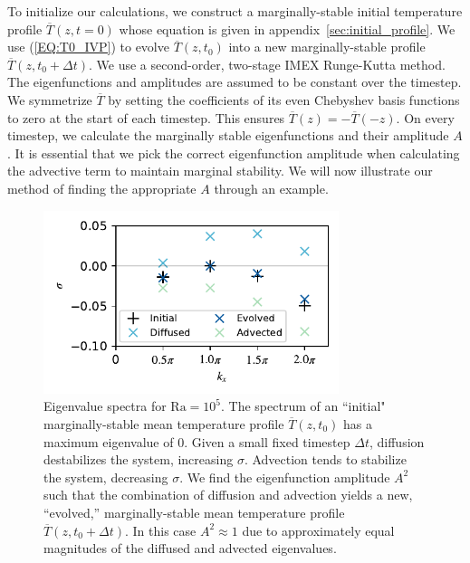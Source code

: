 \documentclass[reprint,amsmath,amssymb,aps,nofootinbib]{revtex4-1}
\newcommand\Ra{\mathrm{Ra}}
\newcommand{\eq}[1]{(\ref{#1})}
\begin{document}


To initialize our calculations, we construct a marginally-stable initial temperature profile $\overline{T}(z, t=0)$ whose equation is given in appendix~\ref{sec:initial_profile}. 
We use \eq{EQ:T0_IVP} to evolve $\overline{T}(z, t_0)$ into a new marginally-stable profile $\overline{T}(z, t_0 + \Delta t)$.
We use a second-order, two-stage IMEX Runge-Kutta method.
The eigenfunctions and amplitudes are assumed to be constant over the timestep.
We symmetrize $\overline{T}$ by setting the coefficients of its even Chebyshev basis functions to zero at the start of each timestep.
This ensures $\overline{T}(z) = -\overline{T}(-z)$.
On every timestep, we calculate the marginally stable eigenfunctions and their amplitude $A$.
It is essential that we pick the correct eigenfunction amplitude when calculating the advective term to maintain marginal stability.
We will now illustrate our method of finding the appropriate $A$ through an example.

\begin{figure}
    \includegraphics[width=3.4in]{EV_spectrum_ol.pdf}
    \caption{Eigenvalue spectra for $\Ra = 10^5$. The spectrum of an ``initial" marginally-stable mean temperature profile $\overline{T}(z, t_0)$ has a maximum eigenvalue of 0. 
    Given a small fixed timestep $\Delta t$, diffusion destabilizes the system, increasing $\sigma$. 
    Advection tends to stabilize the system, decreasing $\sigma$. 
    We find the eigenfunction amplitude $A^2$ such that the combination of diffusion and advection yields a new, ``evolved,'' marginally-stable mean temperature profile $\overline{T}(z, t_0 + \Delta t)$. In this case $A^2 \approx 1$ due to approximately equal magnitudes of the diffused and advected eigenvalues.}
    \label{fig:iteration_spectra} 
\end{figure}
\end{document}
